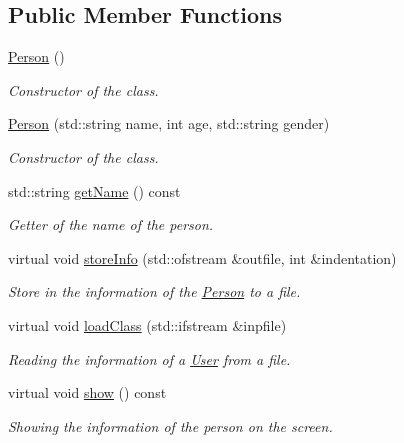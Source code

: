 \subsection*{Public Member Functions}
\begin{DoxyCompactItemize}
\item 
\mbox{\label{class_person_a0397c6f89fafc12e738923f612bc41a3}} 
\mbox{\hyperlink{class_person_a0397c6f89fafc12e738923f612bc41a3}{Person}} ()
\begin{DoxyCompactList}\small\item\em Constructor of the class. \end{DoxyCompactList}\item 
\mbox{\hyperlink{class_person_a19ba5bb7e92c776268b3d453b4ef55b2}{Person}} (std\+::string name, int age, std\+::string gender)
\begin{DoxyCompactList}\small\item\em Constructor of the class. \end{DoxyCompactList}\item 
std\+::string \mbox{\hyperlink{class_person_a9db2e2ccfc6cfa0d7979613ec2aaa922}{get\+Name}} () const
\begin{DoxyCompactList}\small\item\em Getter of the name of the person. \end{DoxyCompactList}\item 
virtual void \mbox{\hyperlink{class_person_a80f87df3f644706c2ad8fc8b800fdd95}{store\+Info}} (std\+::ofstream \&outfile, int \&indentation)
\begin{DoxyCompactList}\small\item\em Store in the information of the \mbox{\hyperlink{class_person}{Person}} to a file. \end{DoxyCompactList}\item 
virtual void \mbox{\hyperlink{class_person_af07a032df8d56dddade4dc43960b536b}{load\+Class}} (std\+::ifstream \&inpfile)
\begin{DoxyCompactList}\small\item\em Reading the information of a \mbox{\hyperlink{class_user}{User}} from a file. \end{DoxyCompactList}\item 
\mbox{\label{class_person_a0206a035f0e88297c8f1c09933dcc86f}} 
virtual void \mbox{\hyperlink{class_person_a0206a035f0e88297c8f1c09933dcc86f}{show}} () const
\begin{DoxyCompactList}\small\item\em Showing the information of the person on the screen. \end{DoxyCompactList}\item 

\end{DoxyCompactItemize}
